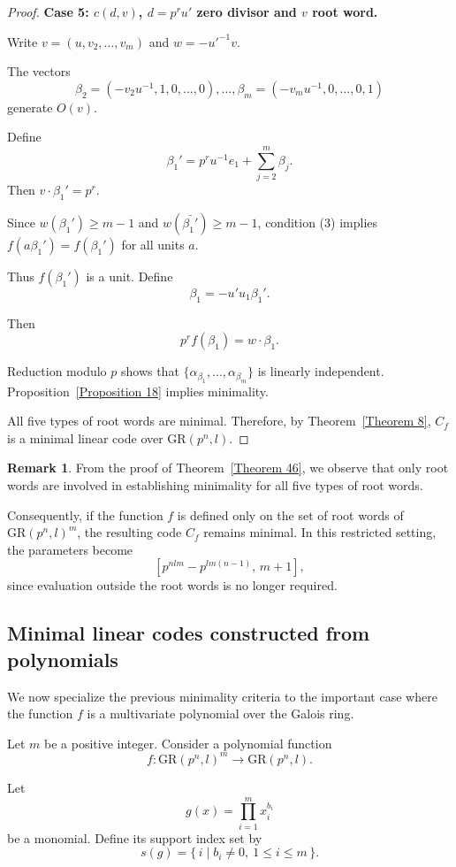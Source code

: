 \documentclass[10pt]{article}
\theoremstyle{definition}
\newtheorem{remark}[lem]{Remark}
\begin{document}
\begin{proof}
\medskip
\noindent
\textbf{Case 5: $c(d,v)$, $d=p^ru'$ zero divisor and $v$ root word.}

Write $v=(u,v_2,\dots,v_m)$
and $w=-u'^{-1}v$.

The vectors
\[
\beta_2=(-v_2u^{-1},1,0,\dots,0),\dots,
\beta_m=(-v_mu^{-1},0,\dots,0,1)
\]
generate $O(v)$.

Define
\[
\beta_1' = p^ru^{-1}e_1 + \sum_{j=2}^m \beta_j.
\]
Then $v\cdot \beta_1'=p^r$.

Since $w(\beta_1')\ge m-1$
and $w(\bar{\beta_1'})\ge m-1$,
condition (3) implies
$f(a\beta_1')=f(\beta_1')$ for all units $a$.

Thus $f(\beta_1')$ is a unit.
Define
\[
\beta_1=-u'u_1\beta_1'.
\]

Then
\[
p^r f(\beta_1)=w\cdot \beta_1.
\]

Reduction modulo $p$ shows that
$\{\alpha_{\beta_1},\dots,\alpha_{\beta_m}\}$
is linearly independent.
Proposition~\ref{Proposition 18}
implies minimality.

\medskip

All five types of root words are minimal.
Therefore, by Theorem~\ref{Theorem 8},
$C_f$ is a minimal linear code over $\mathrm{GR}(p^n,l)$.
\end{proof}

\begin{remark}
From the proof of Theorem~\ref{Theorem 46},
we observe that only root words are involved
in establishing minimality for all five types of root words.

Consequently, if the function $f$ is defined only on the set of
root words of $\mathrm{GR}(p^n,l)^m$,
the resulting code $C_f$ remains minimal.
In this restricted setting,
the parameters become
\[
[p^{nlm}-p^{lm(n-1)},\,m+1],
\]
since evaluation outside the root words is no longer required.
\end{remark}

\subsection{Minimal linear codes constructed from polynomials}

We now specialize the previous minimality criteria
to the important case where the function $f$
is a multivariate polynomial over the Galois ring.

Let $m$ be a positive integer.
Consider a polynomial function
\[
f:\mathrm{GR}(p^n,l)^m \longrightarrow \mathrm{GR}(p^n,l).
\]

Let
\[
g(x)=\prod_{i=1}^{m} x_i^{b_i}
\]
be a monomial.
Define its support index set by
\[
s(g)=\{\, i \mid b_i\neq 0,\ 1\le i\le m \,\}.
\]
\end{document}
